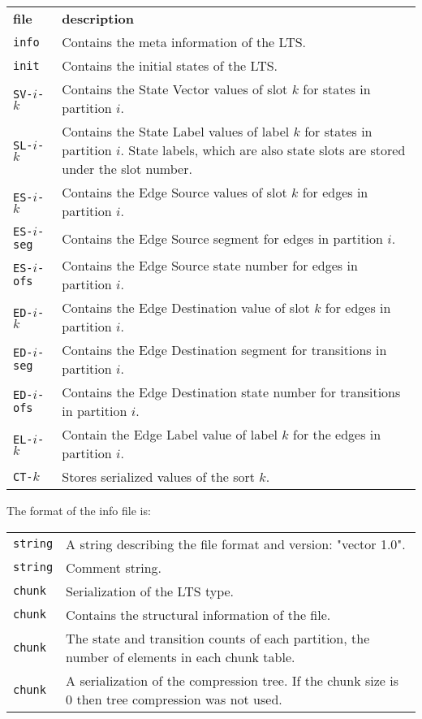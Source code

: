 \documentclass{article}
\theoremstyle{plain}
\begin{document}
\par\noindent\begin{tabularx}{\textwidth}{lX}
{\bf file} & {\bf description}
\\
\verb+info+ & Contains the meta information of the LTS.
\\
\verb+init+ & Contains the initial states of the LTS.
\\
\verb+SV-+$i$\verb+-+$k$ & Contains the State Vector values of slot $k$ for states in partition $i$.
\\
\verb+SL-+$i$\verb+-+$k$ & Contains the State Label values of label $k$ for states in partition $i$.
State labels, which are also state slots are stored under the slot number.
\\
\verb+ES-+$i$\verb+-+$k$ & Contains the Edge Source values of slot $k$ for edges in partition $i$.
\\
\verb+ES-+$i$\verb+-seg+ & Contains the Edge Source segment for edges in partition $i$.
\\
\verb+ES-+$i$\verb+-ofs+ & Contains the Edge Source state number for edges in partition $i$.
\\
\verb+ED-+$i$\verb+-+$k$ & Contains the Edge Destination value of slot $k$ for edges in partition $i$.
\\
\verb+ED-+$i$\verb+-seg+ & Contains the Edge Destination segment for transitions in partition $i$.
\\
\verb+ED-+$i$\verb+-ofs+ & Contains the Edge Destination state number for transitions in partition $i$.
\\
\verb+EL-+$i$\verb+-+$k$ & Contain the Edge Label value of label $k$ for the edges in partition $i$.
\\
\verb+CT-+$k$ & Stores serialized values of the sort $k$.
\end{tabularx}


The format of the info file is:

\par\noindent\begin{tabularx}{\textwidth}{lX}
{\tt string} & A string describing the file format and version: "vector 1.0".
\\
{\tt string} & Comment string.
\\
{\tt chunk} & Serialization of the LTS type.
\\
{\tt chunk} & Contains the structural information of the file.
\\
{\tt chunk} & The state and transition counts of each partition, the number of elements in each chunk table.
\\
{\tt chunk} & A serialization of the compression tree. If the chunk size is 0 then
tree compression was not used.
\end{tabularx}
\end{document}
